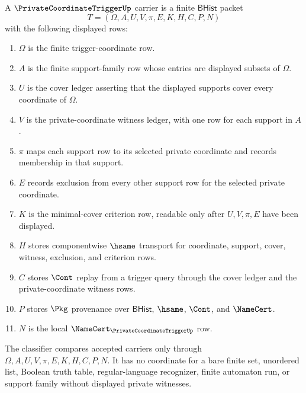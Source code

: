 \begin{definition}
\label{def:private-coordinate-trigger-carrier}
A $\PrivateCoordinateTriggerUp$ carrier is a finite $\mathsf{BHist}$ packet
$$
T=(\Omega,A,U,V,\pi,E,K,H,C,P,N)
$$
with the following displayed rows:
\begin{enumerate}
\item $\Omega$ is the finite trigger-coordinate row.
\item $A$ is the finite support-family row whose entries are displayed subsets of $\Omega$.
\item $U$ is the cover ledger asserting that the displayed supports cover every coordinate of $\Omega$.
\item $V$ is the private-coordinate witness ledger, with one row for each support in $A$.
\item $\pi$ maps each support row to its selected private coordinate and records membership in that support.
\item $E$ records exclusion from every other support row for the selected private coordinate.
\item $K$ is the minimal-cover criterion row, readable only after $U,V,\pi,E$ have been displayed.
\item $H$ stores componentwise $\hsame$ transport for coordinate, support, cover, witness, exclusion, and criterion rows.
\item $C$ stores $\Cont$ replay from a trigger query through the cover ledger and the private-coordinate witness rows.
\item $P$ stores $\Pkg$ provenance over $\mathsf{BHist}$, $\hsame$, $\Cont$, and $\NameCert$.
\item $N$ is the local $\NameCert_{\PrivateCoordinateTriggerUp}$ row.
\end{enumerate}
The classifier compares accepted carriers only through $\Omega,A,U,V,\pi,E,K,H,C,P,N$. It has no coordinate for a bare finite set, unordered list, Boolean truth table, regular-language recognizer, finite automaton run, or support family without displayed private witnesses.
\end{definition}

